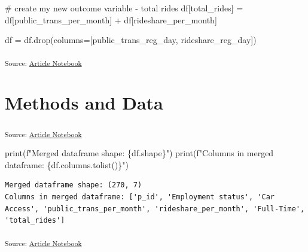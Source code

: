 \documentclass[
  letterpaper,
  DIV=11,
  numbers=noendperiod]{scrartcl}
\newenvironment{Shaded}{\begin{snugshade}}{\end{snugshade}}
\newcommand{\BuiltInTok}[1]{\textcolor[rgb]{0.00,0.23,0.31}{#1}}
\newcommand{\CommentTok}[1]{\textcolor[rgb]{0.37,0.37,0.37}{#1}}
\newcommand{\NormalTok}[1]{\textcolor[rgb]{0.00,0.23,0.31}{#1}}
\newcommand{\OperatorTok}[1]{\textcolor[rgb]{0.37,0.37,0.37}{#1}}
\newcommand{\SpecialCharTok}[1]{\textcolor[rgb]{0.37,0.37,0.37}{#1}}
\newcommand{\SpecialStringTok}[1]{\textcolor[rgb]{0.13,0.47,0.30}{#1}}
\newcommand{\StringTok}[1]{\textcolor[rgb]{0.13,0.47,0.30}{#1}}
\begin{document}
\begin{Shaded}
\begin{Highlighting}[]
\CommentTok{\# create my new outcome variable {-} total rides}
\NormalTok{df[}\StringTok{\textquotesingle{}total\_rides\textquotesingle{}}\NormalTok{] }\OperatorTok{=}\NormalTok{ df[}\StringTok{\textquotesingle{}public\_trans\_per\_month\textquotesingle{}}\NormalTok{] }\OperatorTok{+}\NormalTok{ df[}\StringTok{\textquotesingle{}rideshare\_per\_month\textquotesingle{}}\NormalTok{]}


\NormalTok{df }\OperatorTok{=}\NormalTok{ df.drop(columns}\OperatorTok{=}\NormalTok{[}\StringTok{\textquotesingle{}public\_trans\_reg\_day\textquotesingle{}}\NormalTok{, }\StringTok{\textquotesingle{}rideshare\_reg\_day\textquotesingle{}}\NormalTok{])}
\end{Highlighting}
\end{Shaded}

\textsubscript{Source:
\href{https://RachelRapier.github.io/psych_755_project/index.qmd.html}{Article
Notebook}}

\section{Methods and Data}\label{methods-and-data}

\textsubscript{Source:
\href{https://RachelRapier.github.io/psych_755_project/index.qmd.html}{Article
Notebook}}

\protect{}\label{new_merged_data_info}
\begin{Shaded}
\begin{Highlighting}[]
\BuiltInTok{print}\NormalTok{(}\SpecialStringTok{f"Merged dataframe shape: }\SpecialCharTok{\{}\NormalTok{df}\SpecialCharTok{.}\NormalTok{shape}\SpecialCharTok{\}}\SpecialStringTok{"}\NormalTok{)}
\BuiltInTok{print}\NormalTok{(}\SpecialStringTok{f"Columns in merged dataframe: }\SpecialCharTok{\{}\NormalTok{df}\SpecialCharTok{.}\NormalTok{columns}\SpecialCharTok{.}\NormalTok{tolist()}\SpecialCharTok{\}}\SpecialStringTok{"}\NormalTok{)}
\end{Highlighting}
\end{Shaded}

\begin{verbatim}
Merged dataframe shape: (270, 7)
Columns in merged dataframe: ['p_id', 'Employment status', 'Car Access', 'public_trans_per_month', 'rideshare_per_month', 'Full-Time', 'total_rides']
\end{verbatim}

\textsubscript{Source:
\href{https://RachelRapier.github.io/psych_755_project/index.qmd.html}{Article
Notebook}}
\end{document}
